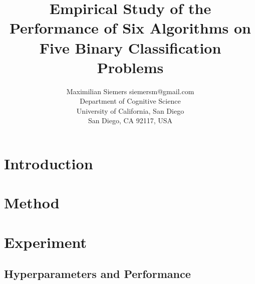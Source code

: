 \documentclass[twoside,11pt]{article}
\begin{document}
	
	\title{Empirical Study of the Performance of Six Algorithms on Five Binary Classification Problems}
	
	\author{\name Maximilian Siemers \email siemersm@gmail.com \\
		\addr Department of Cognitive Science\\
		University of California, San Diego\\
		San Diego, CA 92117, USA}
	
	
	\maketitle
	
	\begin{abstract}%
		
	\end{abstract}
	
	\begin{keywords}
		
	\end{keywords}

	
	\section{Introduction}
	
	\section{Method}
	
	\section{Experiment}
		
		\subsection{Hyperparameters and Performance}
			
		
\end{document}
